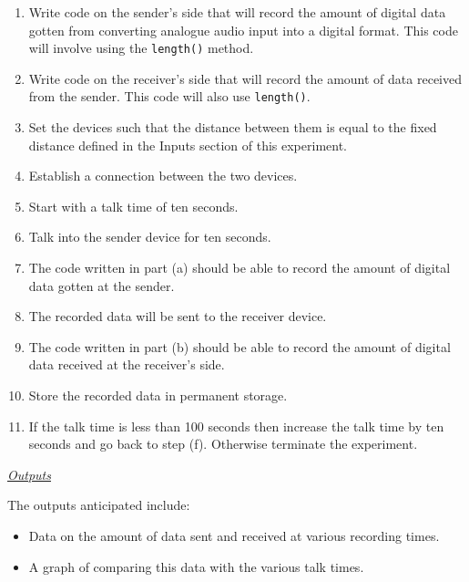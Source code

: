 \documentclass[12pt,svgnames,smaller]{article} %
\begin{document}
\begin{enumerate}
			\begin{enumerate}
				\item Write code on the sender’s side that will record the amount of digital data gotten from converting analogue audio input into a digital format. This code will involve using the \texttt{length()} method.
				\item Write code on the receiver’s side that will record the amount of data received from the sender. This code will also use \texttt{length()}.
				\item Set the devices such that the distance between them is equal to the fixed distance defined in the Inputs section of this experiment.
				\item Establish a connection between the two devices.
				\item Start with a talk time of ten seconds.
				\item Talk into the sender device for ten seconds. 
				\item The code written in part (a) should be able to record the amount of digital data gotten at the sender.
				\item The recorded data will be sent to the receiver device.
				\item The code written in part (b) should be able to record the amount of digital data received at the receiver’s side.
				\item Store the recorded data in permanent storage.
				\item If the talk time is less than 100 seconds then increase the talk time by ten seconds and go back to step (f). Otherwise terminate the experiment. 
				
			\end{enumerate}
			
			\emph{\underline{\textsf{Outputs}}}
			
			The outputs anticipated include:
			
			\begin{itemize}
				\item Data on the amount of data sent and received at various recording times.
				\item A graph of comparing this data with the various talk times. 
			\end{itemize}
			
			
		\end{enumerate}
		
\end{document}
